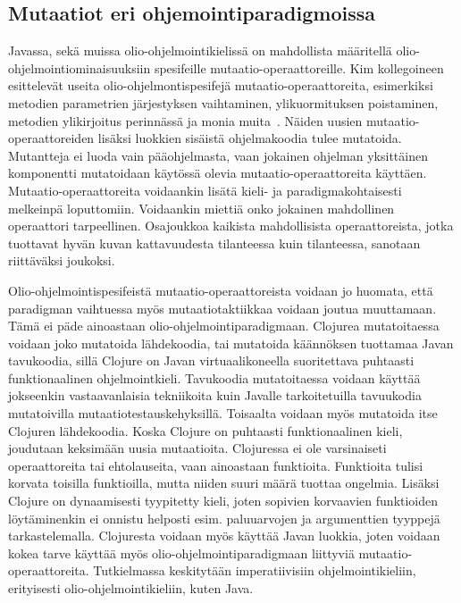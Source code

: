 \documentclass[finnish]{tktltiki2}
\begin{document}
\subsection{Mutaatiot eri ohjemointiparadigmoissa}
Javassa, sekä muissa olio-ohjelmointikielissä on mahdollista määritellä olio-ohjelmointi\-ominaisuuksiin spesifeille mutaatio-operaattoreille. Kim kollegoineen esittelevät useita olio-ohjelmonti\-spesifejä mutaatio-operaattoreita, esimerkiksi metodien parametrien järjestyksen vaihtaminen, ylikuormituksen poistaminen, metodien ylikirjoitus perinnässä ja monia muita~\cite{KimCM00}. Näiden uusien mutaatio-operaattoreiden lisäksi luokkien sisäistä ohjelmakoodia tulee mutatoida. Mutantteja ei luoda vain pääohjelmasta, vaan jokainen ohjelman yksittäinen komponentti mutatoidaan käytössä olevia mutaatio-operaattoreita käyttäen. Mutaatio-operaattoreita voidaankin lisätä kieli- ja paradigmakohtaisesti melkeinpä loputtomiin. Voidaankin miettiä onko jokainen mahdollinen operaattori tarpeellinen. Osajoukkoa kaikista mahdollisista operaattoreista, jotka tuottavat hyvän kuvan kattavuudesta tilanteessa kuin tilanteessa, sanotaan riittäväksi joukoksi.

Olio-ohjelmointispesifeistä mutaatio-operaattoreista voidaan jo huomata, että paradigman vaihtuessa myös mutaatiotaktiikkaa voidaan joutua muuttamaan. Tämä ei päde ainoastaan olio-ohjelmointiparadigmaan. Clojurea mutatoitaessa voidaan joko mutatoida lähdekoodia, tai mutatoida käännöksen tuottamaa Javan tavukoodia, sillä Clojure on Javan virtuaalikoneella suoritettava puhtaasti funktionaalinen ohjelmointkieli. Tavukoodia mutatoitaessa voidaan käyttää jokseenkin vastaavanlaisia tekniikoita kuin Javalle tarkoitetuilla tavuukodia mutatoivilla mutaatiotestauskehyksillä. Toisaalta voidaan myös mutatoida itse Clojuren lähdekoodia. Koska Clojure on puhtaasti funktionaalinen kieli, joudutaan keksimään uusia mutaatioita. Clojuressa ei ole varsinaiseti operaattoreita tai ehtolauseita, vaan ainoastaan funktioita. Funktioita tulisi korvata toisilla funktioilla, mutta niiden suuri määrä tuottaa ongelmia. Lisäksi Clojure on dynaamisesti tyypitetty kieli, joten sopivien korvaavien funktioiden löytäminenkin ei onnistu helposti esim. paluuarvojen ja argumenttien tyyppejä tarkastelemalla. Clojuresta voidaan myös käyttää Javan luokkia, joten voidaan kokea tarve käyttää myös olio-ohjelmointiparadigmaan liittyviä mutaatio-operaattoreita. Tutkielmassa keskitytään imperatiivisiin ohjelmointikieliin, erityisesti olio-ohjelmointikieliin, kuten Java.
\end{document}
